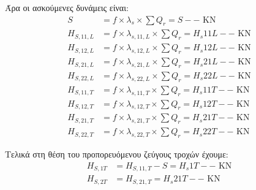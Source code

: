 Άρα οι ασκούμενες δυνάμεις είναι:
\begin{align*}
S                &= f \times λ_s \times \sum{Q_r} = S-- \text{ KN} \\ 
H_{S,11,L}       &= f \times λ_{s,11,L} \times \sum{Q_r} = H_s11L-- \text{ KN} \\ 
H_{S,12,L}       &= f \times λ_{s,12,L} \times \sum{Q_r} = H_s12L-- \text{ KN} \\ 
H_{S,21,L}       &= f \times λ_{s,21,L} \times \sum{Q_r} = H_s21L-- \text{ KN} \\ 
H_{S,22,L}       &= f \times λ_{s,22,L} \times \sum{Q_r} = H_s22L-- \text{ KN} \\ 
H_{S,11,T}       &= f \times λ_{s,11,T} \times \sum{Q_r} = H_s11T-- \text{ KN} \\ 
H_{S,12,T}       &= f \times λ_{s,12,T} \times \sum{Q_r} = H_s12T-- \text{ KN} \\ 
H_{S,21,T}       &= f \times λ_{s,21,T} \times \sum{Q_r} = H_s21T-- \text{ KN} \\ 
H_{S,22,T}       &= f \times λ_{s,22,T} \times \sum{Q_r} = H_s22T-- \text{ KN} 
\end{align*}

Τελικά στη θέση του προπορευόμενου ζεύγους τροχών έχουμε:
\begin{align*}
H_{S,1T} &= H_{S,11,T} - S = H_s1T-- \text{ KN} \\
H_{S,2T} &= H_{S,21,T} = H_s21T-- \text{ KN}
\end{align*}
